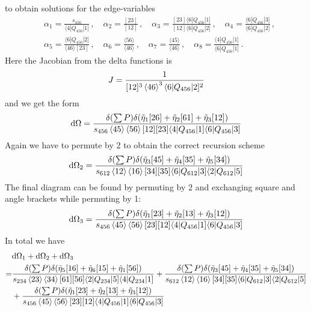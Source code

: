\documentclass[a4paper,12pt]{article}
\newcommand{\ab}[1]{\langle #1 \rangle}
\newcommand{\aMs}[3]{\langle #1|#2|#3]}  		%
\newcommand{\sab}[1]{s_{#1}}
\begin{document}
to obtain solutions for the edge-variables
\begin{equation}
	\begin{aligned}
			& \alpha_1 = \frac{\sab{456}}{\aMs{4}{Q_{456}}{1}}\,, \quad \alpha_2 = \frac{[23]}{[12]}\,, \quad \alpha_3 = \frac{[23]\aMs{6}{Q_{456}}{1}}{[12]\aMs{6}{Q_{456}}{2}}\,, \quad \alpha_4 = \frac{\aMs{6}{Q_{456}}{3}}{\aMs{6}{Q_{456}}{2}}\,,\\ 
		&\alpha_5 = \frac{\aMs{6}{Q_{456}}{2}}{\ab{46}[23]}\,, 
		 \quad
		\alpha_6 = \frac{\ab{56}}{\ab{46}}\,,\quad \alpha_7 = \frac{\ab{45}}{\ab{46}}\,,\quad
		\alpha_8 =  \frac{\aMs{4}{Q_{456}}{1}}{\aMs{6}{Q_{456}}{1}}\,.
	\end{aligned}
\end{equation}
Here the Jacobian from the delta functions is
\begin{equation}
	\begin{aligned}
		J=\frac{1}{[12]^3\expval{46}^3\aMs{6}{Q_{456}}{2}^2}
	\end{aligned}
\end{equation}
and we get the form
\begin{equation}
	\begin{aligned}
		\dd \Omega=\frac{\delta(\sum P)\delta(\tilde\eta_1[26]+\tilde\eta_2[61]+\tilde\eta_3[12])}{s_{456}\expval{45}\expval{56}[12][23]\aMs{4}{Q_{456}}{1}\aMs{6}{Q_{456}}{3}}
	\end{aligned}
\end{equation}
Again we have to permute by 2 to obtain the correct recursion scheme
\begin{equation}
	\begin{aligned}
		\dd \Omega_2=\frac{\delta(\sum P)\delta(\tilde\eta_3[45]+\tilde\eta_4[35]+\tilde\eta_5[34])}{s_{612}\expval{12}\expval{16}[34][35]\aMs{6}{Q_{612}}{3}\aMs{2}{Q_{612}}{5}}
	\end{aligned}
\end{equation}
The final diagram can be found by permuting by $2$ and exchanging square and angle brackets while permuting by 1:
\begin{equation}
	\begin{aligned}
		\dd \Omega_3=\frac{\delta(\sum P)\delta(\tilde\eta_1[23]+\tilde\eta_2[13]+\tilde\eta_3[12])}{s_{456}\expval{45}\expval{56}[23][12]\aMs{4}{Q_{456}}{1}\aMs{6}{Q_{456}}{3}}
	\end{aligned}
\end{equation}
In total we have
\begin{equation}
	\begin{aligned}
		&\dd \Omega_1 +\dd \Omega_2+\dd \Omega_3\\
		=&\frac{\delta(\sum P)\delta(\tilde\eta_5[16]+\tilde\eta_6[15]+\tilde\eta_1[56])}{s_{234}\expval{23}\expval{34}[61][56]\aMs{2}{Q_{234}}{5}\aMs{4}{Q_{234}}{1}}
		+\frac{\delta(\sum P)\delta(\tilde\eta_3[45]+\tilde\eta_4[35]+\tilde\eta_5[34])}{s_{612}\expval{12}\expval{16}[34][35]\aMs{6}{Q_{612}}{3}\aMs{2}{Q_{612}}{5}}
		\\&+\frac{\delta(\sum P)\delta(\tilde\eta_1[23]+\tilde\eta_2[13]+\tilde\eta_3[12])}{s_{456}\expval{45}\expval{56}[23][12]\aMs{4}{Q_{456}}{1}\aMs{6}{Q_{456}}{3}}
	\end{aligned}
\end{equation}
\end{document}
